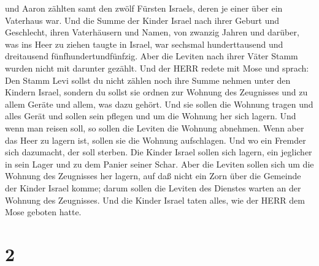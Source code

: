 und Aaron zählten samt den zwölf Fürsten Israels, deren je einer über
ein Vaterhaus war.  Und die Summe der Kinder Israel nach
ihrer Geburt und Geschlecht, ihren Vaterhäusern und Namen, von zwanzig
Jahren und darüber, was ins Heer zu ziehen taugte in Israel,
 war sechsmal hunderttausend und dreitausend
fünfhundertundfünfzig.  Aber die Leviten nach ihrer Väter
Stamm wurden nicht mit darunter gezählt.  Und der HERR
redete mit Mose und sprach:  Den Stamm Levi sollst du nicht
zählen noch ihre Summe nehmen unter den Kindern Israel, 
sondern du sollst sie ordnen zur Wohnung des Zeugnisses und zu allem
Geräte und allem, was dazu gehört. Und sie sollen die Wohnung tragen und
alles Gerät und sollen sein pflegen und um die Wohnung her sich lagern.
 Und wenn man reisen soll, so sollen die Leviten die
Wohnung abnehmen. Wenn aber das Heer zu lagern ist, sollen sie die
Wohnung aufschlagen. Und wo ein Fremder sich dazumacht, der soll
sterben.  Die Kinder Israel sollen sich lagern, ein
jeglicher in sein Lager und zu dem Panier seiner Schar. 
Aber die Leviten sollen sich um die Wohnung des Zeugnisses her lagern,
auf daß nicht ein Zorn über die Gemeinde der Kinder Israel komme; darum
sollen die Leviten des Dienstes warten an der Wohnung des Zeugnisses.
 Und die Kinder Israel taten alles, wie der HERR dem Mose
geboten hatte.

\hypertarget{section-1}{%
\section{2}\label{section-1}}

